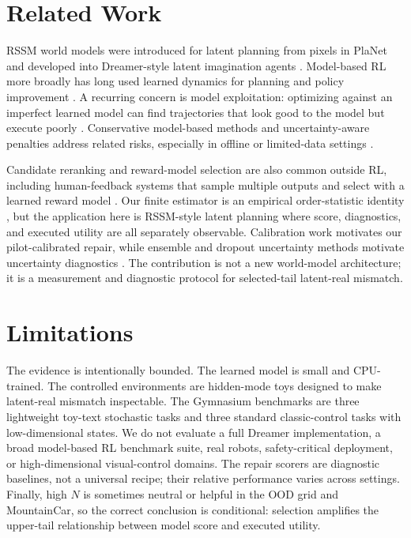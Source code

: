 \documentclass{article}
\newcommand{\rssm}{RSSM}
\begin{document}
\section{Related Work}

RSSM world models were introduced for latent planning from pixels in PlaNet and developed into Dreamer-style latent imagination agents \citep{hafner2019planet,hafner2020dreamer,hafner2021dreamerv2,hafner2023dreamerv3}. Model-based RL more broadly has long used learned dynamics for planning and policy improvement \citep{deisenroth2011pilco,chua2018pets,janner2019mbpo}. A recurring concern is model exploitation: optimizing against an imperfect learned model can find trajectories that look good to the model but execute poorly \citep{talvitie2017selfcorrecting}. Conservative model-based methods and uncertainty-aware penalties address related risks, especially in offline or limited-data settings \citep{kidambi2020morel,yu2020mopo}.

Candidate reranking and reward-model selection are also common outside RL, including human-feedback systems that sample multiple outputs and select with a learned reward model \citep{stiennon2020summarize,nakano2021webgpt,gao2023overoptimization}. Our finite estimator is an empirical order-statistic identity \citep{david2003orderstatistics}, but the application here is \rssm-style latent planning where score, diagnostics, and executed utility are all separately observable. Calibration work \citep{guo2017calibration} motivates our pilot-calibrated repair, while ensemble and dropout uncertainty methods motivate uncertainty diagnostics \citep{gal2016dropout,lakshminarayanan2017ensembles}. The contribution is not a new world-model architecture; it is a measurement and diagnostic protocol for selected-tail latent-real mismatch.

\section{Limitations}

The evidence is intentionally bounded. The learned model is small and CPU-trained. The controlled environments are hidden-mode toys designed to make latent-real mismatch inspectable. The Gymnasium benchmarks are three lightweight toy-text stochastic tasks and three standard classic-control tasks with low-dimensional states. We do not evaluate a full Dreamer implementation, a broad model-based RL benchmark suite, real robots, safety-critical deployment, or high-dimensional visual-control domains. The repair scorers are diagnostic baselines, not a universal recipe; their relative performance varies across settings. Finally, high \(N\) is sometimes neutral or helpful in the OOD grid and MountainCar, so the correct conclusion is conditional: selection amplifies the upper-tail relationship between model score and executed utility.
\end{document}
